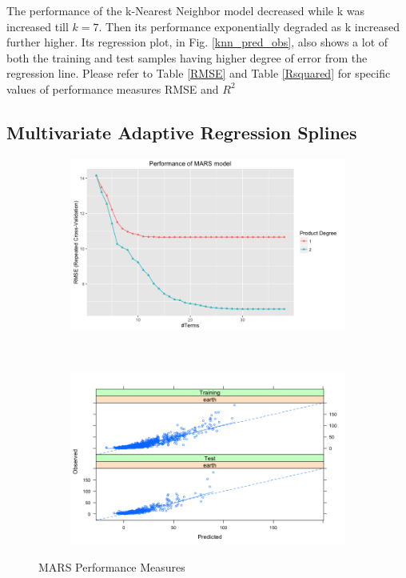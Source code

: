 \documentclass[letterpaper,12pt,titlepage,oneside,final]{report}
\begin{document}
            The performance of the k-Nearest Neighbor model decreased while k was increased till $k = 7$. Then its performance exponentially degraded as k increased further higher. Its regression plot, in Fig. \ref{knn_pred_obs}, also shows a lot of both the training and test samples having higher degree of error from the regression line. Please refer to Table \ref{RMSE} and Table \ref{Rsquared} for specific values of performance measures RMSE and $R^2$

        \subsection {Multivariate Adaptive Regression Splines}
            \begin{figure}[!ht]
            \begin{subfigure}[t]{0.5\textwidth}
                \centering
                \includegraphics[width=1.1\textwidth]{marsresults}
                \caption{}
                \label{marsresults}
            \end{subfigure}%
                ~ 
            \begin{subfigure}[t]{0.5\textwidth}
                \centering
                \includegraphics[width=1.1\textwidth]{mars_pred_obs}
                \caption{}
                \label{mars_pred_obs}
            \end{subfigure}
            \caption{MARS Performance Measures}
            \end{figure}
\end{document}
